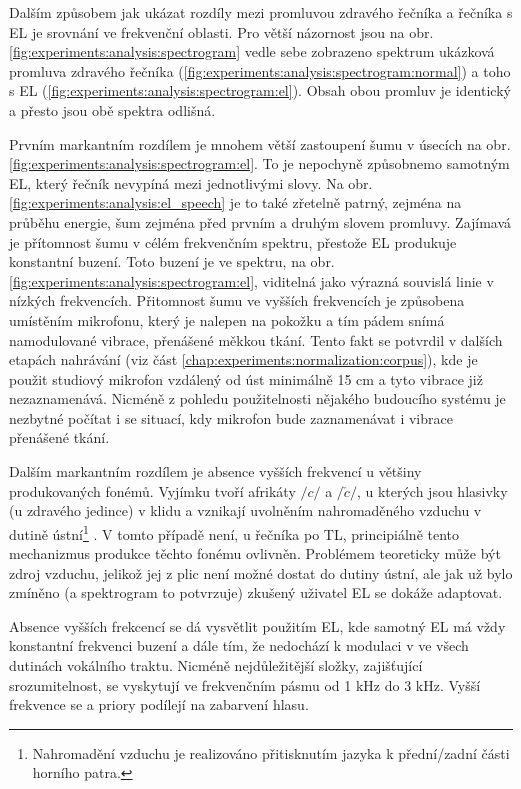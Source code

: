 Dalším způsobem jak ukázat rozdíly mezi promluvou zdravého řečníka a řečníka s EL je srovnání ve frekvenční oblasti. Pro větší názornost jsou na obr. \ref{fig:experiments:analysis:spectrogram} vedle sebe zobrazeno spektrum ukázková promluva zdravého řečníka (\ref{fig:experiments:analysis:spectrogram:normal}) a toho s EL (\ref{fig:experiments:analysis:spectrogram:el}). Obsah obou promluv je identický a přesto jsou obě spektra odlišná.

Prvním markantním rozdílem je mnohem větší zastoupení šumu v úsecích  na obr. \ref{fig:experiments:analysis:spectrogram:el}. To je nepochyně způsobnemo samotným EL, který řečník nevypíná mezi jednotlivými slovy. Na obr. \ref{fig:experiments:analysis:el_speech} je to také zřetelně patrný, zejména na průběhu energie, šum zejména před prvním a druhým slovem promluvy. Zajímavá je přítomnost šumu v célém frekvenčním spektru, přestože EL produkuje konstantní buzení. Toto buzení je ve spektru, na obr. \ref{fig:experiments:analysis:spectrogram:el}, viditelná jako výrazná souvislá linie v nízkých frekvencích. Přitomnost šumu ve vyšších frekvencích je způsobena umístěním mikrofonu, který je nalepen na pokožku a tím pádem snímá namodulované vibrace, přenášené měkkou tkání. Tento fakt se potvrdil v dalších etapách nahrávání (viz část \ref{chap:experiments:normalization:corpus}), kde je použit studiový mikrofon vzdálený od úst minimálně 15 cm a tyto vibrace již nezaznamenává. Nicméně z pohledu použitelnosti nějakého budoucího systému je nezbytné počítat i se situací, kdy mikrofon bude zaznamenávat i vibrace přenášené tkání.

Dalším markantním rozdílem je absence vyšších frekvencí u většiny produkovaných fonémů. Vyjímku tvoří afrikáty $/c/$ a $/\check{c}/$, u kterých jsou hlasivky (u zdravého jedince) v klidu a vznikají uvolněním nahromaděného vzduchu v dutině ústní\footnote{Nahromadění vzduchu je realizováno přitisknutím jazyka k přední/zadní části horního patra.} \cite{Psutka2006}. V tomto případě není, u řečníka po TL, principiálně tento mechanizmus produkce těchto fonému ovlivněn. Problémem teoreticky může být zdroj vzduchu, jelikož jej z plic není možné dostat do dutiny ústní, ale jak už bylo zmíněno (a spektrogram to potvrzuje) zkušený uživatel EL se dokáže adaptovat.

Absence vyšších frekcencí se dá vysvětlit použitím EL, kde samotný EL má vždy konstantní frekvenci buzení a dále tím, že nedochází k modulaci v ve všech dutinách vokálního traktu. Nicméně nejdůležitější složky, zajišťující srozumitelnost, se vyskytují ve frekvenčním pásmu od 1 kHz do 3 kHz. Vyšší frekvence se a priory podílejí na zabarvení hlasu.

